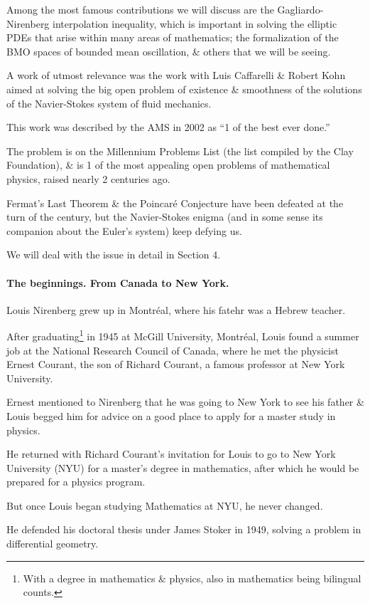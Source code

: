 \documentclass{article}
\begin{document}
Among the most famous contributions we will discuss are the Gagliardo-Nirenberg interpolation inequality, which is important in solving the elliptic PDEs that arise within many areas of mathematics; the formalization of the BMO spaces of bounded mean oscillation, \& others that we will be seeing.

%
A work of utmost relevance was the work with Luis Caffarelli \& Robert Kohn aimed at solving the big open problem of existence \& smoothness of the solutions of the Navier-Stokes system of fluid mechanics.

This work was described by the AMS in 2002 as ``1 of the best ever done.''

The problem is on the Millennium Problems List (the list compiled by the Clay Foundation), \& is 1 of the most appealing open problems of mathematical physics, raised nearly 2 centuries ago.

Fermat's Last Theorem \& the Poincar\'e Conjecture have been defeated at the turn of the century, but the Navier-Stokes enigma (and in some sense its companion about the Euler's system) keep defying us.

We will deal with the issue in detail in Section 4.

\paragraph{The beginnings. From Canada to New York.} Louis Nirenberg grew up in Montr\'eal, where his fatehr was a Hebrew teacher.

After graduating\footnote{With a degree in mathematics \& physics, also in mathematics being bilingual counts.} in 1945 at McGill University, Montréal, Louis found a summer job at the National Research Council of Canada, where he met the physicist Ernest Courant, the son of Richard Courant, a famous professor at New York University.

Ernest mentioned to Nirenberg that he was going to New York to see his father \& Louis begged him for advice on a good place to apply for a master study in physics.

He returned with Richard Courant's invitation for Louis to go to New York University (NYU) for a master's degree in mathematics, after which he would be prepared for a physics program.

%
But once Louis began studying Mathematics at NYU, he never changed.

He defended his doctoral thesis under James Stoker in 1949, solving a problem in differential geometry.
\end{document}
